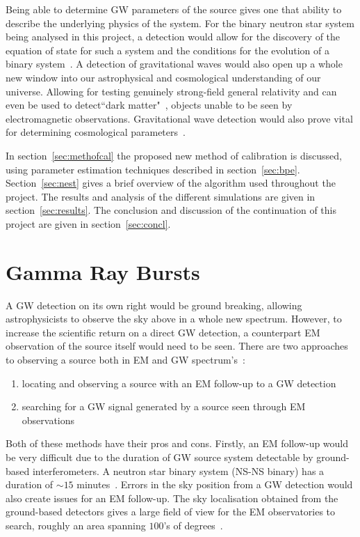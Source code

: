\documentclass{jpconf}
\begin{document}
Being able to determine GW parameters of the source gives one that ability to describe the underlying physics of the system. For the binary neutron star system being analysed in this project, a detection would allow for the discovery of the equation of state for such a system and the conditions for the evolution of a binary system~\cite{dynamic}. A detection of gravitational waves would also open up a whole new window into our astrophysical and cosmological understanding of our universe. Allowing for testing genuinely strong-field general relativity and can even be used to detect``dark matter"~\cite{darkmatter}, objects unable to be seen by electromagnetic observations. Gravitational wave detection would also prove vital for determining cosmological parameters~\cite{Schutz,KThorne,chernofffinn}.




In section~\ref{sec:methofcal} the proposed new method of calibration is discussed, using parameter estimation techniques described in section~\ref{sec:bpe}. Section~\ref{sec:nest} gives a brief overview of the algorithm used throughout the project. The results and analysis of the different simulations are given in section~\ref{sec:results}. The conclusion and discussion of the continuation of this project are given in section~\ref{sec:concl}.

\section{Gamma Ray Bursts}



A GW detection on its own right would be ground breaking, allowing astrophysicists to observe the sky above in a whole new spectrum. However, to increase the scientific return on a direct GW detection, a counterpart EM observation of the source itself would need to be seen.
There are two approaches to observing a source both in EM and GW spectrum's~\cite{grb}: 
\begin{enumerate}
\item locating and observing a source with an EM follow-up to a GW detection
\item searching for a GW signal generated by a source seen through EM observations
\end{enumerate}
Both of these methods have their pros and cons. Firstly, an EM follow-up would be very difficult due to the duration of GW source system detectable by ground-based interferometers. A neutron star binary system (NS-NS binary) has a duration of $\sim15$ minutes~\cite{bnstime}. Errors in the sky position from a GW detection would also create issues for an EM follow-up. The sky localisation obtained from the ground-based detectors gives a large field of view for the EM observatories to search, roughly an area spanning $100$'s of degrees~\cite{grb}. 
\end{document}
